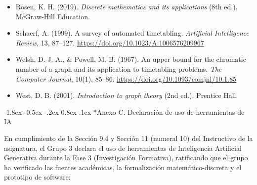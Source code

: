 \documentclass[12pt,a4paper]{article}
\makeatletter
\renewcommand\section{\@startsection {section}{1}{\z@}%
                                   {-1.8ex \@plus -0.5ex \@minus -.2ex}%
                                   {0.8ex \@plus.1ex}%
                                   {\normalfont\large\bfseries}}
\theoremstyle{definition}
\makeatother
\begin{document}
\begin{singlespace}
\begin{itemize}
    \item[] Rosen, K. H. (2019). \textit{Discrete mathematics and its applications} (8th ed.). McGraw-Hill Education.
    \item[] Schaerf, A. (1999). A survey of automated timetabling. \textit{Artificial Intelligence Review}, 13, 87--127. \url{https://doi.org/10.1023/A:1006576209967}
    \item[] Welsh, D. J. A., \& Powell, M. B. (1967). An upper bound for the chromatic number of a graph and its application to timetabling problems. \textit{The Computer Journal}, 10(1), 85--86. \url{https://doi.org/10.1093/comjnl/10.1.85}
    \item[] West, D. B. (2001). \textit{Introduction to graph theory} (2nd ed.). Prentice Hall.
\end{itemize}
\end{singlespace}

\newpage
\section*{Anexo C. Declaración de uso de herramientas de IA}

En cumplimiento de la Sección 9.4 y Sección 11 (numeral 10) del Instructivo de la asignatura, el Grupo 3 declara el uso de herramientas de Inteligencia Artificial Generativa durante la Fase 3 (Investigación Formativa), ratificando que el grupo ha verificado las fuentes académicas, la formalización matemático-discreta y el prototipo de software:
\end{document}
